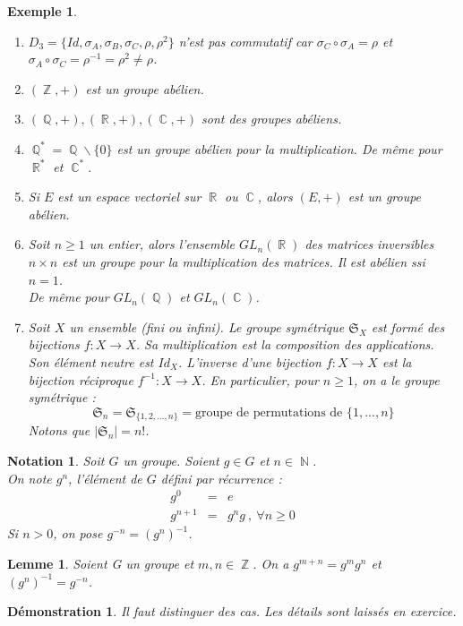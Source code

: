 \documentclass[a4paper, oneside]{report}
\theoremstyle{break}
\newtheorem{lemme}[thm]{Lemme}
\newtheorem{nota}[thm]{Notation}
\newtheorem{exem}[thm]{Exemple}
\newtheorem*{demo}{Démonstration}
\newcommand{\ev}{espace vectoriel }
\newcommand{\x}{\times}
\DeclareMathOperator{\R}{\mathbb{R}}
\DeclareMathOperator{\N}{\mathbb{N}}
\DeclareMathOperator{\C}{\mathbb{C}}
\DeclareMathOperator{\Z}{\mathbb{Z}}
\DeclareMathOperator{\Q}{\mathbb{Q}}
\renewcommand{\S}{\mathfrak{S}}
\begin{document}
\begin{exem}
	\begin{enumerate}
		\item $D_3=\{Id, \sigma_A, \sigma_B, \sigma_C, \rho, \rho^2\}$ n'est pas commutatif car $\sigma_C \circ \sigma_A = \rho$ et $\sigma_A \circ \sigma_C = \rho^{-1} = \rho ^2 \neq \rho$.
		\item $(\Z, +)$ est un groupe abélien.
		\item $(\Q,+), (\R,+), (\C,+)$ sont des groupes abéliens.
		\item $\Q^*=\Q \backslash \{0\}$ est un groupe abélien pour la multiplication. De même pour $\R^*$ et $\C^*$.
		\item Si $E$ est un \ev sur $\R$ ou $\C$, alors $(E,+)$ est un groupe abélien.
		\item Soit $n\geq 1$ un entier, alors l'ensemble $GL_n(\R)$ des matrices inversibles $n\x n$ est un groupe pour la multiplication des matrices. Il est abélien ssi $n=1$.\\
		De même pour $GL_n(\Q)$ et $GL_n(\C)$.\\
		\item Soit $X$ un ensemble (fini ou infini). Le groupe symétrique $\S_X$ est formé des bijections $f:X\rightarrow X$. Sa multiplication est la composition des applications. Son élément neutre est $Id_X$. L'inverse d'une bijection $f:X\rightarrow X$ est la bijection réciproque $f^{-1}:X\rightarrow X$. En particulier, pour $n\geq 1$, on a le groupe symétrique :
		$$\S_n = \S_{\{1,2,...,n\}} = \text{groupe de permutations de } \{1,...,n\}$$
		Notons que $|\S_n|=n!$.
	\end{enumerate}	
\end{exem}

\begin{nota}
	Soit $G$ un groupe. Soient $g\in G$ et $n\in \N$.\\
	On note $g^n$, l'élément de $G$ défini par récurrence :
	$$\begin{array}{lll}
	g^0&=&e\\
	g^{n+1}&=&g^ng~,~\forall n \geq 0
	\end{array}$$
	Si $n>0$, on pose $g^{-n}=(g^n)^{-1}$.	
\end{nota}

\begin{lemme}
	Soient G un groupe et $m,n\in\Z$. On a $g^{m+n}=g^mg^n$ et $(g^n)^{-1}=g^{-n}$.
\end{lemme}
	

\begin{demo}
	Il faut distinguer des cas. Les détails sont laissés en exercice.	
\end{demo}
\end{document}
